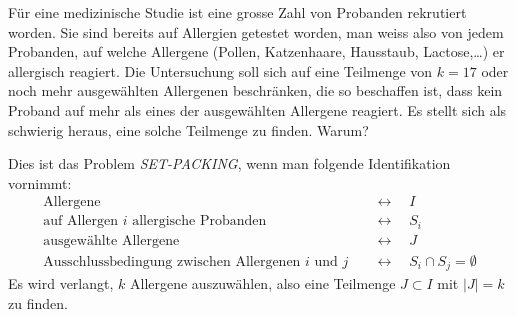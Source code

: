 Für eine medizinische Studie ist eine grosse Zahl von Probanden rekrutiert
worden.
Sie sind bereits auf Allergien getestet worden, man weiss also von jedem
Probanden, auf welche Allergene (Pollen, Katzenhaare, Hausstaub, Lactose,\dots)
er allergisch reagiert.
Die Untersuchung soll sich auf eine Teilmenge von $k=17$ oder noch
mehr ausgewählten
Allergenen beschränken, die so beschaffen ist, dass kein Proband auf mehr als 
eines der ausgewählten Allergene reagiert.
Es stellt sich als schwierig heraus, eine solche Teilmenge zu finden.
Warum?

\begin{loesung}
Dies ist das Problem {\em SET-PACKING}, wenn man folgende Identifikation
vornimmt:
\begin{align*}
\text{Allergene}                            &\quad\leftrightarrow\quad I\\
\text{auf Allergen $i$ allergische Probanden}&\quad\leftrightarrow\quad S_i\\
\text{ausgewählte Allergene}               &\quad\leftrightarrow\quad J\\
\text{Ausschlussbedingung zwischen Allergenen $i$ und $j$}&\quad\leftrightarrow\quad S_i\cap S_j = \emptyset
\end{align*}
Es wird verlangt, $k$ Allergene auszuwählen, also eine Teilmenge
$J\subset I$ mit $|J|=k$ zu finden.
\end{loesung}


